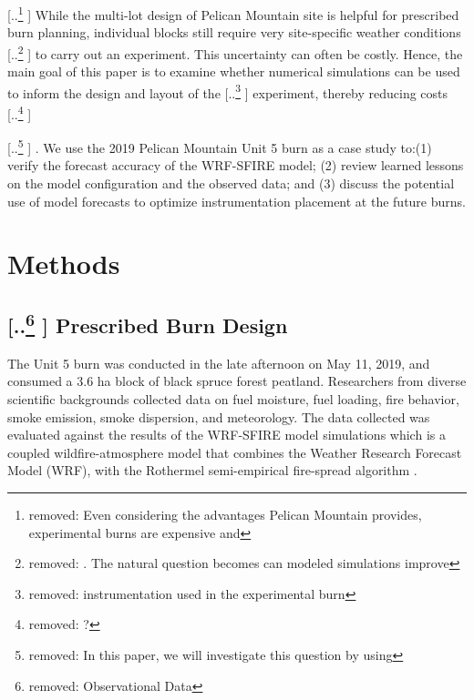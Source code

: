 \documentclass[preprints,article,accept,moreauthors,pdftex]{Definitions/mdpi}
\providecommand{\DIFadd}[1]{{\protect\color{blue} \sf #1}} %
\providecommand{\DIFdel}[1]{{\protect\color{red} [..\footnote{removed: #1} ]}} %
\providecommand{\DIFaddbegin}{} %
\providecommand{\DIFaddend}{} %
\providecommand{\DIFdelbegin}{} %
\providecommand{\DIFdelend}{} %
\begin{document}
\DIFdelbegin \DIFdel{Even considering the advantages Pelican Mountain provides, experimental burns are expensive and }\DIFdelend \DIFaddbegin \DIFadd{While the multi-lot design of Pelican Mountain site is helpful for prescribed burn planning, individual blocks still }\DIFaddend require very site-specific weather conditions \DIFdelbegin \DIFdel{. The natural question becomes can modeled simulations improve }\DIFdelend \DIFaddbegin \DIFadd{to carry out an experiment. This uncertainty can often be costly. Hence, the main goal of this paper is to examine whether numerical simulations can be used to inform }\DIFaddend the design and layout of the \DIFdelbegin \DIFdel{instrumentation used in the experimental burn}\DIFdelend \DIFaddbegin \DIFadd{experiment}\DIFaddend , thereby reducing costs\DIFdelbegin \DIFdel{?
}%

\DIFdel{In this paper, we will investigate this question by using }\DIFdelend \DIFaddbegin \DIFadd{. We use }\DIFaddend the 2019 Pelican Mountain Unit 5 burn as a case study to:(1) verify the forecast accuracy of the WRF-SFIRE model; (2) review learned lessons on the model configuration and the observed data; and (3) discuss the potential use of model forecasts to optimize instrumentation placement at the future burns.

\section{Methods}
\subsection{\DIFdelbegin \DIFdel{Observational Data}\DIFdelend \DIFaddbegin \DIFadd{Prescribed Burn Design}\DIFaddend }

The Unit 5 burn was conducted in the late afternoon on May 11, 2019, and consumed a 3.6 ha block of black spruce forest peatland. Researchers from diverse scientific backgrounds collected data on fuel moisture, fuel loading, fire behavior, smoke emission, smoke dispersion, and meteorology. The data collected was evaluated against the results of the WRF-SFIRE model simulations which is a coupled wildfire-atmosphere model that combines the Weather Research Forecast Model (WRF), with the Rothermel semi-empirical fire-spread algorithm \cite{mandel_coupled_2011,mandel_recent_2014}.
\end{document}
